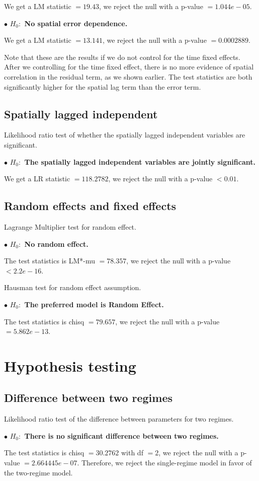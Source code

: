 \documentclass[11pt,a4paper]{amsart}
\theoremstyle{plain}
\theoremstyle{definition}
\begin{document}
We get a LM statistic $= 19.43$, we reject the null with a  p-value $= 1.044e-05$. 

$\bullet$ \textbf{$H_{0}:$ No spatial error dependence.} 

We get a LM statistic $= 13.141$, we reject the null with a  p-value $= 0.0002889$. 

Note that these are the results if we do not control for the time fixed effects. After we controlling for the time fixed effect, there is no more evidence of spatial correlation in the residual term, as we shown earlier. The test statistics are both significantly higher for the spatial lag term than the error term.

\subsection{Spatially lagged independent}\hfill\par

Likelihood ratio test of whether the spatially lagged independent variables are significant.

$\bullet$ \textbf{$H_{0}:$ The spatially lagged independent variables are jointly significant.} 

We get a LR statistic $= 118.2782$, we reject the null with a  p-value $< 0.01$. 

\subsection{Random effects and fixed effects}\hfill\par

Lagrange Multiplier test for random effect.

$\bullet$ \textbf{$H_{0}:$ No random effect.}

The test statistics is LM*-mu $= 78.357$, we reject the null with a p-value $< 2.2e-16$.

Hausman test for random effect assumption.

$\bullet$ \textbf{$H_{0}:$ The preferred model is Random Effect.}

The test statistics is chisq $= 79.657$, we reject the null with a p-value $= 5.862e-13$.

\section{Hypothesis testing}\hfill\par

\subsection{Difference between two regimes}\hfill\par

Likelihood ratio test of the difference between parameters for two regimes.

$\bullet$ \textbf{$H_{0}:$ There is no significant difference between two regimes.}

The test statistics is chisq $= 30.2762$ with df $= 2$, we reject the null with a p-value $= 2.664445e-07$. Therefore, we reject the single-regime model in favor of the two-regime model.


\printbibliography
\end{document}
